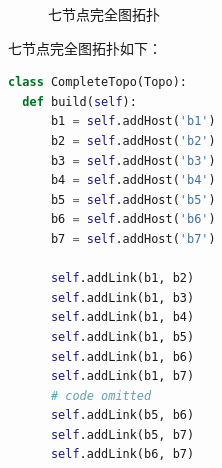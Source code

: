 \documentclass[UTF8]{report}
\begin{document}
\begin{figure}[H]
  \centering
  \hspace{0pt}
  \caption{七节点完全图拓扑}  
\end{figure}

七节点完全图拓扑如下：

\begin{lstlisting}[language=Python]
  class CompleteTopo(Topo):
  def build(self):
      b1 = self.addHost('b1')
      b2 = self.addHost('b2')
      b3 = self.addHost('b3')
      b4 = self.addHost('b4')
      b5 = self.addHost('b5')
      b6 = self.addHost('b6')
      b7 = self.addHost('b7')

      self.addLink(b1, b2)
      self.addLink(b1, b3)
      self.addLink(b1, b4)
      self.addLink(b1, b5)
      self.addLink(b1, b6)
      self.addLink(b1, b7)
      # code omitted
      self.addLink(b5, b6)
      self.addLink(b5, b7)
      self.addLink(b6, b7)
\end{lstlisting}
\end{document}
